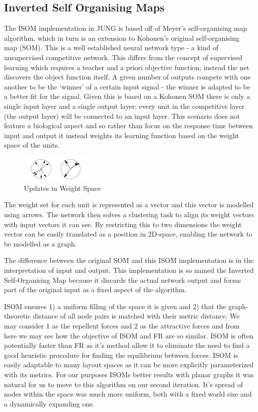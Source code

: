 \documentclass[11pt, a4paper]{report}
\begin{document}
\subsection{Inverted Self Organising Maps}

The ISOM implementation in JUNG is based off of Meyer’s self-organising map algorithm, which in turn is an extension to Kohonen’s original self-organising map (SOM). This is a well established neural network type - a kind of unsupervised competitive network. This differs from the concept of supervised learning which requires a teacher and a priori objective function; instead the net discovers the object function itself. A given number of outputs compete with one another to be the ‘winner’ of a certain input signal - the winner is adapted to be a better fit for the signal. Given this is based on a Kohonen SOM there is only a single input layer and a single output layer; every unit in the competitive layer (the output layer) will be connected to an input layer. This scenario does not feature a biological aspect and so rather than focus on the response time between input and output it instead weights its learning function based on the weight space of the units.

\begin{figure}[h]
        \centering
        \includegraphics[width=0.3\textwidth]{images/final/weight.png}
        \caption{Updates in Weight Space}
\end{figure}

The weight set for each unit is represented as a vector and this vector is modelled using arrows. The network then solves a clustering task to align its weight vectors with input vectors it can see. By restricting this to two dimensions the weight vector can be easily translated as a position in 2D-space, enabling the network to be modelled as a graph. 

The difference between the original SOM and this ISOM implementation is in the interpretation of input and output. This implementation is so named the Inverted Self-Organising Map because it discards the actual network output and forms part of the original input as a fixed aspect of the algorithm.

ISOM ensures 1) a uniform filling of the space it is given and 2) that the graph-theoretic distance of all node pairs is matched with their metric distance. We may consider 1 as the repellent forces and 2 as the attractive forces and from here we may see how the objective of ISOM and FR are so similar. ISOM is often potentially faster than FR as it’s method allow it to eliminate the need to find a good heuristic procedure for finding the equilibrium between forces. ISOM is easily adaptable to many layout spaces as it can be more explicitly parameterized with its metrics. For our purposes ISOMs better results with planar graphs it was natural for us to move to this algorithm on our second iteration. It’s spread of nodes within the space was much more uniform, both with a fixed world size and a dynamically expanding one.
\end{document}
